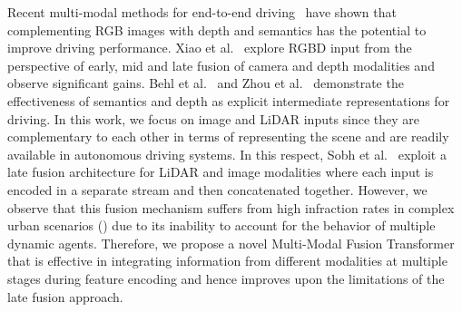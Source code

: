 \documentclass[final]{cvpr}
\newcommand{\boldparagraph}[1]{\vspace{0.1cm}\noindent{\bf #1:}}
\begin{document}
\boldparagraph{Multi-Modal Autonomous Driving} Recent multi-modal methods for end-to-end driving~\cite{Xiao2019ARXIV, Zhou2019SR, Sobh2018NEURIPSW, Behl2020IROS} have shown that complementing RGB images with depth and semantics has the potential to improve driving performance. Xiao et al.~\cite{Xiao2019ARXIV} explore RGBD input from the perspective of early, mid and late fusion of camera and depth modalities and observe significant gains. Behl et al.~\cite{Behl2020IROS} and Zhou et al.~\cite{Zhou2019SR} demonstrate the effectiveness of semantics and depth as explicit intermediate representations for driving. In this work, we focus on image and LiDAR inputs since they are complementary to each other in terms of representing the scene and are readily available in autonomous driving systems. In this respect, Sobh et al.~\cite{Sobh2018NEURIPSW} exploit a late fusion architecture for LiDAR and image modalities where each input is encoded in a separate stream and then concatenated together. However, we observe that this fusion mechanism suffers from high infraction rates in complex urban scenarios () due to its inability to account for the behavior of multiple dynamic agents. Therefore, we propose a novel Multi-Modal Fusion Transformer that is effective in integrating information from different modalities at multiple stages during feature encoding and hence improves upon the limitations of the late fusion approach. 
\end{document}
